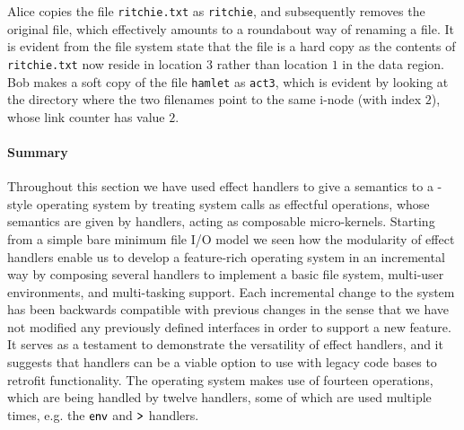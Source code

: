\documentclass[12pt,phd,lfcs,twoside,openright,logo,leftchapter,normalheadings]{infthesis}
\theoremstyle{plain}
\theoremstyle{definition}
\begin{document}
%
Alice copies the file \texttt{ritchie.txt} as \texttt{ritchie}, and
subsequently removes the original file, which effectively amounts to a
roundabout way of renaming a file. It is evident from the file system
state that the file is a hard copy as the contents of
\texttt{ritchie.txt} now reside in location $3$ rather than location
$1$ in the data region. Bob makes a soft copy of the file
\texttt{hamlet} as \texttt{act3}, which is evident by looking at the
directory where the two filenames point to the same i-node (with index
$2$), whose link counter has value $2$.

\paragraph{Summary} Throughout this section we have used effect
handlers to give a semantics to a \UNIX{}-style operating system by
treating system calls as effectful operations, whose semantics are
given by handlers, acting as composable micro-kernels. Starting from a
simple bare minimum file I/O model we seen how the modularity of
effect handlers enable us to develop a feature-rich operating system
in an incremental way by composing several handlers to implement a
basic file system, multi-user environments, and multi-tasking
support. Each incremental change to the system has been backwards
compatible with previous changes in the sense that we have not
modified any previously defined interfaces in order to support a new
feature. It serves as a testament to demonstrate the versatility of
effect handlers, and it suggests that handlers can be a viable option
to use with legacy code bases to retrofit functionality. The operating
system makes use of fourteen operations, which are being handled by
twelve handlers, some of which are used multiple times, e.g. the
$\mathsf{env}$ and $\texttt{>}$ handlers.


\end{document}
